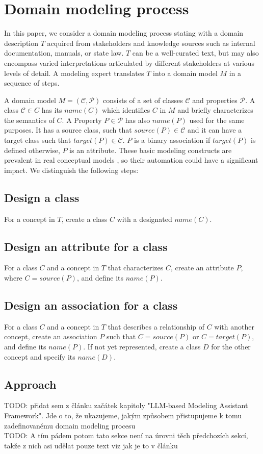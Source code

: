\chapter{Domain modeling process}

In this paper, we consider a domain modeling process stating with a domain description $T$ acquired from stakeholders and knowledge sources such as internal documentation, manuals, or state law. $T$ can be a well-curated text, but may also encompass varied interpretations articulated by different stakeholders at various levels of detail. A modeling expert translates $T$ into a domain model $M$ in a sequence of steps.

A domain model $M = (\mathcal{C}, \mathcal{P})$ consists of a set of classes $\mathcal{C}$ and properties $\mathcal{P}$. A class $\mathcal{C} \in C$ has its $name(C)$ which identifies $C$ in $M$ and briefly characterizes the semantics of $C$. A Property $P \in \mathcal{P}$ has also $name(P)$ used for the same purposes. It has a source class, such that $source(P) \in \mathcal{C}$ and it can have a target class such that $target(P) \in \mathcal{C}$. $P$ is a binary association if $target(P)$ is defined otherwise, $P$ is an attribute. These basic modeling constructs are prevalent in real conceptual models \cite{Keet2015}, so their automation could have a significant impact. We distinguish the following steps:


\section{Design a class}
For a concept in $T$, create a class $C$ with a designated $name(C)$.

\section{Design an attribute for a class}
For a class $C$ and a concept in $T$ that characterizes $C$, create an attribute $P$, where $C = source(P)$, and define its $name(P)$.


\section{Design an association for a class}
For a class $C$ and a concept in $T$ that describes a relationship of $C$ with another concept, create an association $P$ such that $C = source(P)$ or $C = target(P)$, and define its $name(P)$. If not yet represented, create a class $D$ for the other concept and specify its $name(D)$.


\section{Approach}

TODO: přidat sem z článku začátek kapitoly "LLM-based Modeling Assistant Framework". Jde o to, že ukazujeme, jakým způsobem přistupujeme k tomu zadefinovanému domain modeling procesu \\

TODO: A tím pádem potom tato sekce není na úrovni těch předchozích sekcí, takže z nich asi udělat pouze text viz jak je to v článku \\